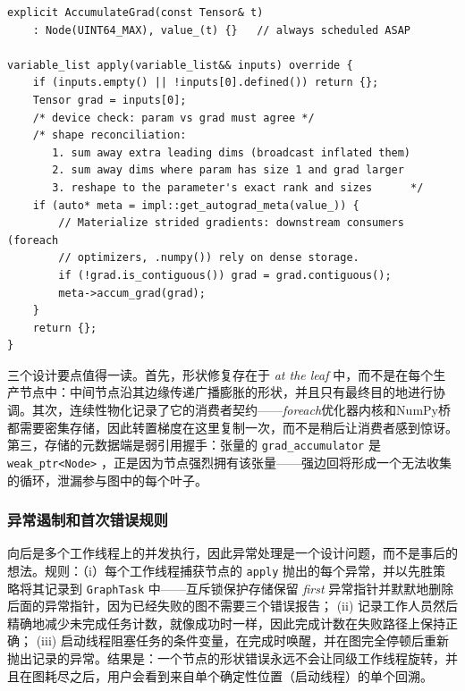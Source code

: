 \begin{lstlisting}[caption={The leaf node's shape reconciliation: the same reduce-then-reshape logic as the engine-wide \texttt{sum\_to\_shape}, specialized for parameters.}]
explicit AccumulateGrad(const Tensor& t)
    : Node(UINT64_MAX), value_(t) {}   // always scheduled ASAP

variable_list apply(variable_list&& inputs) override {
    if (inputs.empty() || !inputs[0].defined()) return {};
    Tensor grad = inputs[0];
    /* device check: param vs grad must agree */
    /* shape reconciliation:
       1. sum away extra leading dims (broadcast inflated them)
       2. sum away dims where param has size 1 and grad larger
       3. reshape to the parameter's exact rank and sizes      */
    if (auto* meta = impl::get_autograd_meta(value_)) {
        // Materialize strided gradients: downstream consumers (foreach
        // optimizers, .numpy()) rely on dense storage.
        if (!grad.is_contiguous()) grad = grad.contiguous();
        meta->accum_grad(grad);
    }
    return {};
}
\end{lstlisting}

三个设计要点值得一读。首先，形状修复存在于 \emph{at the leaf} 中，而不是在每个生产节点中：中间节点沿其边缘传递广播膨胀的形状，并且只有最终目的地进行协调。其次，连续性物化记录了它的消费者契约——\emph{foreach}优化器内核和NumPy桥都需要密集存储，因此转置梯度在这里复制一次，而不是稍后让消费者感到惊讶。第三，存储的元数据端是弱引用握手：张量的 \texttt{grad\_accumulator} 是 \texttt{weak\_ptr<Node>} ，正是因为节点强烈拥有该张量——强边回将形成一个无法收集的循环，泄漏参与图中的每个叶子。

\subsubsection{异常遏制和首次错误规则}
\label{subsubsec:exceptions}

向后是多个工作线程上的并发执行，因此异常处理是一个设计问题，而不是事后的想法。规则：（i）每个工作线程捕获节点的 \texttt{apply} 抛出的每个异常，并以先胜策略将其记录到 \texttt{GraphTask} 中——互斥锁保护存储保留 \emph{first} 异常指针并默默地删除后面的异常指针，因为已经失败的图不需要三个错误报告； (ii) 记录工作人员然后精确地减少未完成任务计数，就像成功时一样，因此完成计数在失败路径上保持正确； (iii) 启动线程阻塞任务的条件变量，在完成时唤醒，并在图完全停顿后重新抛出记录的异常。结果是：一个节点的形状错误永远不会让同级工作线程旋转，并且在图耗尽之后，用户会看到来自单个确定性位置（启动线程）的单个回溯。

